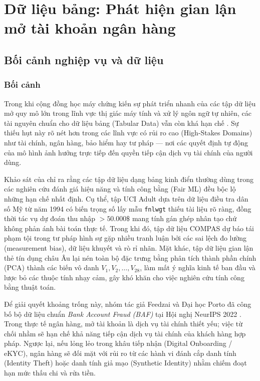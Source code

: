 \section{Dữ liệu bảng: Phát hiện gian lận mở tài khoản ngân hàng}
\label{sec:tabular}

\subsection{Bối cảnh nghiệp vụ và dữ liệu}
\label{subsec:tab_context}

\subsubsection{Bối cảnh}
Trong khi cộng đồng học máy chứng kiến sự phát triển nhanh của các tập dữ liệu mở quy mô lớn trong lĩnh vực thị giác máy tính và xử lý ngôn ngữ tự nhiên, các tài nguyên chuẩn cho dữ liệu bảng (Tabular Data) vẫn còn khá hạn chế \cite{jesus2022turning}. Sự thiếu hụt này rõ nét hơn trong các lĩnh vực có rủi ro cao (High-Stakes Domains) như tài chính, ngân hàng, bảo hiểm hay tư pháp — nơi các quyết định tự động của mô hình ảnh hưởng trực tiếp đến quyền tiếp cận dịch vụ tài chính của người dùng.

Khảo sát của \cite{jesus2022turning} chỉ ra rằng các tập dữ liệu dạng bảng kinh điển thường dùng trong các nghiên cứu đánh giá hiệu năng và tính công bằng (Fair ML) đều bộc lộ những hạn chế nhất định. Cụ thể, tập UCI Adult dựa trên dữ liệu điều tra dân số Mỹ từ năm 1994 có biến trọng số lấy mẫu \texttt{fnlwgt} thiếu tài liệu rõ ràng, đồng thời tác vụ dự đoán thu nhập $> 50.000\$$ mang tính gán ghép nhân tạo chứ không phản ánh bài toán thực tế. Trong khi đó, tập dữ liệu COMPAS dự báo tái phạm tội trong tư pháp hình sự gặp nhiều tranh luận bởi các sai lệch đo lường (measurement bias), dữ liệu khuyết và rò rỉ nhãn. Mặt khác, tập dữ liệu gian lận thẻ tín dụng châu Âu lại nén toàn bộ đặc trưng bằng phân tích thành phần chính (PCA) thành các biến vô danh $V_1, V_2, \dots, V_{28}$, làm mất ý nghĩa kinh tế ban đầu và lược bỏ các thuộc tính nhạy cảm, gây khó khăn cho việc nghiên cứu tính công bằng thuật toán.

Để giải quyết khoảng trống này, nhóm tác giả Feedzai và Đại học Porto đã công bố bộ dữ liệu chuẩn \textit{Bank Account Fraud (BAF)} tại Hội nghị NeurIPS 2022 \cite{jesus2022turning}. Trong thực tế ngân hàng, mở tài khoản là dịch vụ tài chính thiết yếu; việc từ chối nhầm sẽ hạn chế khả năng tiếp cận dịch vụ tài chính của khách hàng hợp pháp. Ngược lại, nếu lỏng lẻo trong khâu tiếp nhận (Digital Onboarding / eKYC), ngân hàng sẽ đối mặt với rủi ro từ các hành vi đánh cắp danh tính (Identity Theft) hoặc danh tính giả mạo (Synthetic Identity) nhằm chiếm đoạt hạn mức thấu chi và rửa tiền.


